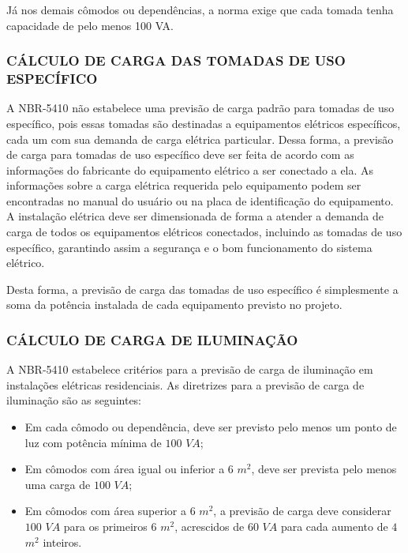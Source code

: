 Já nos demais cômodos ou dependências, a norma exige que cada tomada tenha capacidade de pelo menos 100 VA.

\subsubsection{CÁLCULO DE CARGA DAS TOMADAS DE USO ESPECÍFICO}

A NBR-5410 não estabelece uma previsão de carga padrão para tomadas de uso específico, pois essas tomadas são destinadas a equipamentos elétricos específicos, cada um com sua demanda de carga elétrica particular. Dessa forma, a previsão de carga para tomadas de uso específico deve ser feita de acordo com as informações do fabricante do equipamento elétrico a ser conectado a ela. As informações sobre a carga elétrica requerida pelo equipamento podem ser encontradas no manual do usuário ou na placa de identificação do equipamento. A instalação elétrica deve ser dimensionada de forma a atender a demanda de carga de todos os equipamentos elétricos conectados, incluindo as tomadas de uso específico, garantindo assim a segurança e o bom funcionamento do sistema elétrico.

Desta forma, a previsão de carga das tomadas de uso específico é simplesmente a soma da potência instalada de cada equipamento previsto no projeto.

\subsubsection{CÁLCULO DE CARGA DE ILUMINAÇÃO}

A NBR-5410 estabelece critérios para a previsão de carga de iluminação em instalações elétricas residenciais. As diretrizes para a previsão de carga de iluminação são as seguintes:

\begin{itemize}
	\item Em cada cômodo ou dependência, deve ser previsto pelo menos um ponto de luz com potência mínima de $100$ $VA$;
	\item Em cômodos com área igual ou inferior a $6$ $m^2$, deve ser prevista pelo menos uma carga de $100$ $VA$;
	\item Em cômodos com área superior a $6$ $m^2$, a previsão de carga deve considerar $100$ $VA$ para os primeiros $6$ $m^2$, acrescidos de $60$ $VA$ para cada aumento de $4$ $m^2$ inteiros.
	
\end{itemize}

